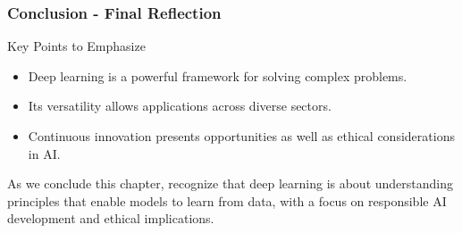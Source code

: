 \documentclass[aspectratio=169]{beamer}
\begin{document}
\begin{frame}[fragile]
    \frametitle{Conclusion - Final Reflection}
    \begin{block}{Key Points to Emphasize}
        \begin{itemize}
            \item Deep learning is a powerful framework for solving complex problems.
            \item Its versatility allows applications across diverse sectors.
            \item Continuous innovation presents opportunities as well as ethical considerations in AI.
        \end{itemize}
    \end{block}
    
    As we conclude this chapter, recognize that deep learning is about understanding principles that enable models to learn from data, with a focus on responsible AI development and ethical implications.
\end{frame}
\end{document}
